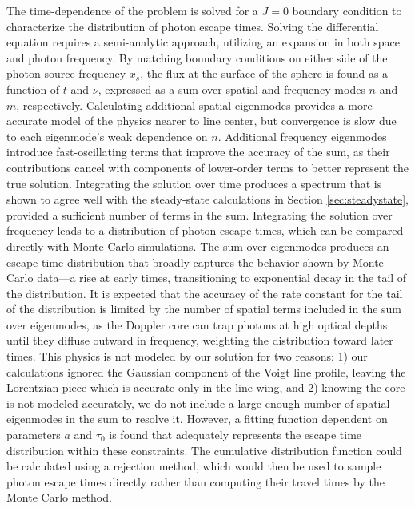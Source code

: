 \documentclass{aastex63}
\begin{document}
The time-dependence of the problem is solved for a $J=0$ boundary condition to characterize the distribution of photon escape times. Solving the differential equation requires a semi-analytic approach, utilizing an expansion in both space and photon frequency. By matching boundary conditions on either side of the photon source frequency $x_s$, the flux at the surface of the sphere is found as a function of $t$ and $\nu$, expressed as a sum over spatial and frequency modes $n$ and $m$, respectively. Calculating additional spatial eigenmodes provides a more accurate model of the physics nearer to line center, but convergence is slow due to each eigenmode's weak dependence on $n$. Additional frequency eigenmodes introduce fast-oscillating terms that improve the accuracy of the sum, as their contributions cancel with components of lower-order terms to better represent the true solution. Integrating the solution over time produces a spectrum that is shown to agree well with the steady-state calculations in Section \ref{sec:steadystate}, provided a sufficient number of terms in the sum. Integrating the solution over frequency leads to a distribution of photon escape times, which can be compared directly with Monte Carlo simulations. The sum over eigenmodes produces an escape-time distribution that broadly captures the behavior shown by Monte Carlo data---a rise at early times, transitioning to exponential decay in the tail of the distribution. 
It is expected that the accuracy of the rate constant for the tail of the distribution is limited by the number of spatial terms included in the sum over eigenmodes, as the Doppler core can trap photons at high optical depths until they diffuse outward in frequency, weighting the distribution toward later times. This physics is not modeled by our solution for two reasons: 1) our calculations ignored the Gaussian component of the Voigt line profile, leaving the Lorentzian piece which is accurate only in the line wing, and 2) knowing the core is not modeled accurately, we do not include a large enough number of spatial eigenmodes in the sum to resolve it. 
%
However, a fitting function dependent on parameters $a$ and $\tau_0$ is found that adequately represents the escape time distribution within these constraints. The cumulative distribution function could be calculated using a rejection method, which would then be used to sample photon escape times directly rather than computing their travel times by the Monte Carlo method.
\end{document}
